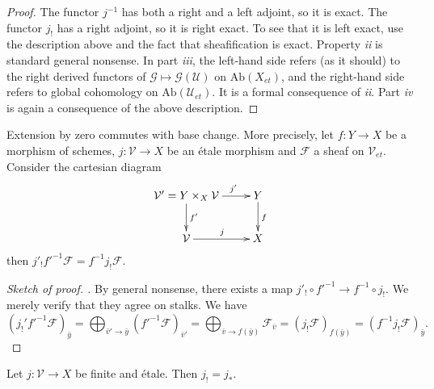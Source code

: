 \begin{proof}
The functor $j^{-1}$ has both a right and a left adjoint, so it is exact. The 
functor $j_!$ has a right adjoint, so it is right exact. To see that it is left 
exact, use the description above and the fact that sheafification is exact. 
Property {\it ii} is standard general nonsense. In part {\it iii}, the 
left-hand side refers (as it should) to the right derived functors of 
$\mathcal{G}\mapsto \mathcal{G}(\mathcal{U})$ on $\text{Ab}(X_{et})$, and the 
right-hand side refers to global cohomology on $\text{Ab}(\mathcal{U}_{et})$. 
It is a formal consequence of {\it ii}. Part {\it iv} is again a consequence of 
the above description.
\end{proof}

\begin{lemma} \label{lem:shriekCommutesWithBaseChange}
Extension by zero commutes with base change. More precisely, let $f: Y \to X$ 
be a morphism of schemes, $j: \mathcal{V} \to X$ be an \'etale morphism and 
$\mathcal{F}$ a sheaf on $\mathcal{V}_{et}$. Consider the cartesian diagram 
$$
\xymatrix{
{\mathcal{V}'=Y\times_X \mathcal{V}} \ar^{f'}[d] \ar^{\qquad j'}[r] & {Y} 
\ar^{f}[d] \\
{\mathcal{V}} \ar^{j}[r] & {X}
}
$$
then $j'_! f'^{-1}\mathcal{F} = f^{-1}j_!\mathcal{F}$.
\end{lemma}

\begin{proof}[Sketch of proof. ]
By general nonsense, there exists a map $j'_! \circ f'^{-1} \to f^{-1}\circ 
j_!$. We merely verify that they agree on stalks. We have
$$
\left(j_!'f'^{-1}\mathcal{F}\right)_{\bar y}  = 
\bigoplus_{\bar v' \to \bar y} (f'^{-1}\mathcal{F})_{\bar v'} =
\bigoplus_{\bar v \to f(\bar y)} \mathcal{F}_{\bar v} = 
(j_!\mathcal{F})_{f(\bar y)} =  
(f^{-1}j_!\mathcal{F})_{\bar y}.
$$
\end{proof}

\begin{lemma} \label{lem:ShriekEqualsStarForFiniteEtale}
Let $j: \mathcal{V}\to X$ be finite and \'etale. Then $j_! = j_*$.
\end{lemma}

